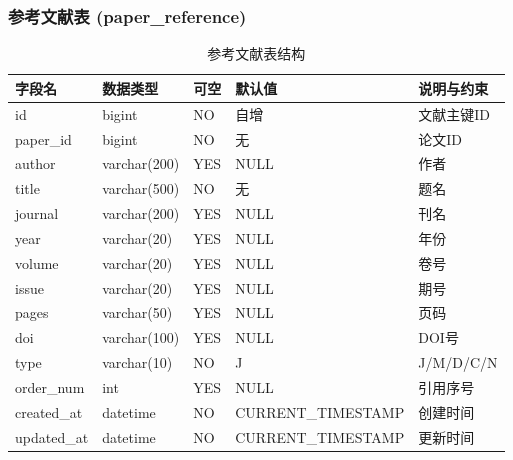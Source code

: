 \documentclass{../template/softeng}
\begin{document}
	\subsubsection{参考文献表 (paper\_reference)}
	\begin{table}[htbp]
		\centering
		\begin{tabular}{|l|l|l|l|l|}
			\hline
			\textbf{字段名} & \textbf{数据类型} & \textbf{可空} & \textbf{默认值} & \textbf{说明与约束} \\
			\hline
			id & bigint & NO & 自增 & 文献主键ID \\
			paper\_id & bigint & NO & 无 & 论文ID \\
			author & varchar(200) & YES & NULL & 作者 \\
			title & varchar(500) & NO & 无 & 题名 \\
			journal & varchar(200) & YES & NULL & 刊名 \\
			year & varchar(20) & YES & NULL & 年份 \\
			volume & varchar(20) & YES & NULL & 卷号 \\
			issue & varchar(20) & YES & NULL & 期号 \\
			pages & varchar(50) & YES & NULL & 页码 \\
			doi & varchar(100) & YES & NULL & DOI号 \\
			type & varchar(10) & NO & J & J/M/D/C/N \\
			order\_num & int & YES & NULL & 引用序号 \\
			created\_at & datetime & NO & CURRENT\_TIMESTAMP & 创建时间 \\
			updated\_at & datetime & NO & CURRENT\_TIMESTAMP & 更新时间 \\
			\hline
		\end{tabular}
		\caption{参考文献表结构}
	\end{table}
\end{document}
